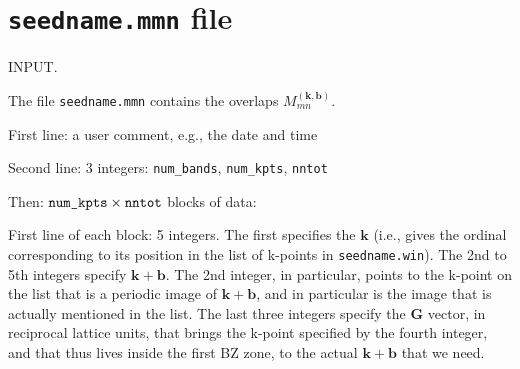 %
%
%
%

\section{{\tt seedname.mmn} file} 

INPUT. 

The file \verb#seedname.mmn# contains the overlaps
$M_{mn}^{(\mathbf{k,b})}$.

First line: a user comment, e.g., the date and time

Second line: 3 integers: \verb#num_bands#, \verb#num_kpts#,
\verb#nntot#

Then: $\verb#num_kpts#\times\verb#nntot#$ blocks of data:
 
First line of each block: 5 integers. The first specifies the
$\mathbf{k}$ (i.e., gives the ordinal corresponding to its position in
the list  of k-points in \verb#seedname.win#). The 2nd to 5th integers
specify $\mathbf{k+b}$. The  2nd integer, in particular, points to the
k-point on the list that is a  periodic image of $\mathbf{k+b}$, and
in particular is the image that is actually mentioned in the list. The 
last three integers specify the $\mathbf{G}$ vector, in  reciprocal
lattice units, that brings the k-point specified by the fourth
integer, and that thus lives inside the first BZ zone, to the actual
$\mathbf{k+b}$ that we need.

